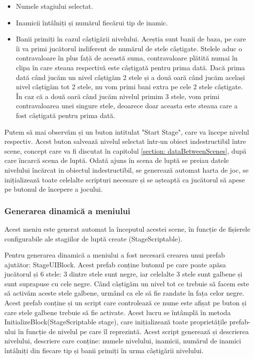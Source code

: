 \documentclass[12pt, a4paper]{article}
\begin{document}
	\begin{itemize}
		\item Numele stagiului selectat.
		\item Inamicii întâlniți și numărul fiecărui tip de inamic.
		\item Banii primiți în cazul câștigării nivelului. Aceștia sunt banii de baza, pe care îi va primi jucătorul indiferent de numărul de stele câștigate. Stelele aduc o contravaloare în plus față de această suma, contravaloare plătită numai în clipa în care steaua respectivă este câștigată pentru prima dată. Dacă prima dată când jucăm un nivel câștigăm 2 stele și a două oară când jucăm același nivel câștigăm tot 2 stele, nu vom primi bani extra pe cele 2 stele câștigate. În caz că a două oară când jucăm nivelul primim 3 stele, vom primi contravaloarea unei singure stele, deoarece doar aceasta este steaua care a fost câștigată pentru prima dată.
	\end{itemize}
	
	Putem să mai observăm și un buton intitulat "Start Stage", care va începe nivelul respectiv. Acest buton salvează nivelul selectat într-un obiect indestructibil între scene, concept care va fi discutat în capitolul \ref{section: dataBetweenScenes}, după care încarcă scena de luptă. Odată ajuns în scena de luptă se preiau datele nivelului încărcat in obiectul indestructibil, se generează automat harta de joc, se inițializează toate celelalte scripturi necesare și se așteaptă ca jucătorul să apese pe butonul de începere a jocului.
	\newline
	
	\subsubsection{Generarea dinamică a meniului}
	
	Acest meniu este generat automat la începutul acestei scene, în funcție de fișierele configurabile ale stagiilor de luptă create (StageScriptable).
	\newline
	
	Pentru generarea dinamică a meniului a fost necesară crearea unui prefab ajutător: StageUIBlock. Acest prefab conține butonul pe care poate apăsa jucătorul și 6 stele: 3 dintre stele sunt negre, iar celelalte 3 stele sunt galbene și sunt suprapuse cu cele negre. Când câștigăm un nivel tot ce trebuie să facem este să activăm aceste stele galbene, urmând ca ele să fie randate în fața celor negre. Acest prefab conține și un script care controlează ce nume este afișat pe buton și care stele galbene trebuie să fie activate. Acest lucru se întâmplă în metoda InitializeBlock(StageScriptable stage), care inițializează toate proprietățile prefab-ului în funcție de nivelul pe care îl reprezintă. Acest script generează și descrierea nivelului, descriere care conține: numele nivelului, inamicii, numărul de inamici întâlniți din fiecare tip și banii primiți în urma câștigării nivelului.
	\newline
	
\end{document}
